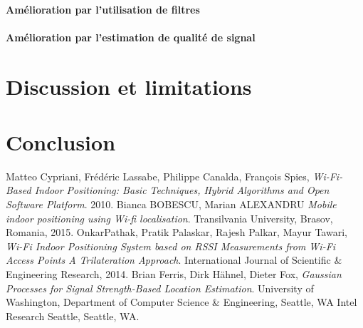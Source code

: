 \documentclass[11pt,journal,compsoc]{IEEEtran}
\begin{document}
      \paragraph{Amélioration par l'utilisation de filtres}
      \paragraph{Amélioration par l'estimation de qualité de signal}
\section{Discussion et limitations}
\section{Conclusion}

\begin{thebibliography}{9}
    Matteo Cypriani, Frédéric Lassabe, Philippe Canalda, François Spies,
    \emph{Wi-Fi-Based Indoor Positioning: Basic Techniques, Hybrid Algorithms and Open Software Platform}.
    2010.
    Bianca BOBESCU, Marian ALEXANDRU
    \emph{Mobile indoor positioning using Wi-fi localisation}.
    Transilvania University, Brasov, Romania,
    2015.
    OnkarPathak, Pratik Palaskar, Rajesh Palkar, Mayur Tawari,
    \emph{Wi-Fi Indoor Positioning System based on RSSI Measurements from Wi-Fi Access Points A Trilateration Approach}.
    International Journal of Scientific \& Engineering Research,
    2014.
    Brian Ferris, Dirk Hähnel, Dieter Fox,
    \emph{Gaussian Processes for Signal Strength-Based Location Estimation}.
    University of Washington, Department of Computer Science \& Engineering, Seattle, WA Intel Research Seattle, Seattle, WA.
\end{thebibliography}
\end{document}
